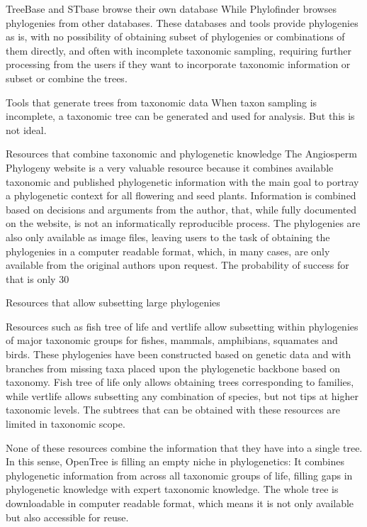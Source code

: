\documentclass[oupdraft]{sysbio_sse}
\begin{document}
TreeBase and STbase browse their own database
While Phylofinder browses phylogenies from other databases.
These databases and tools provide phylogenies as is, with no possibility of obtaining subset of phylogenies or combinations of them directly, and often with incomplete taxonomic sampling, requiring further processing from the users if they want to incorporate taxonomic information or subset or combine the trees.

Tools that generate trees from taxonomic data
When taxon sampling is incomplete, a taxonomic tree can be generated and used for analysis. But this is not ideal.

Resources that combine taxonomic and phylogenetic knowledge
The Angiosperm Phylogeny website is a very valuable resource because it combines available taxonomic and published phylogenetic information with the main goal to portray a phylogenetic context for all flowering and seed plants. Information is combined based on decisions and arguments from the author, that, while fully documented on the website, is not an informatically reproducible process. The phylogenies are also only available as image files, leaving users to the task of obtaining the phylogenies in a computer readable format, which, in many cases, are only available from the original authors upon request. The probability of success for that is only 30%

Resources that allow subsetting large phylogenies

Resources such as fish tree of life and vertlife allow subsetting within phylogenies of major taxonomic groups for fishes, mammals, amphibians, squamates and birds. These phylogenies have been constructed based on genetic data and with branches from missing taxa placed upon the phylogenetic backbone based on taxonomy. Fish tree of life only allows obtaining trees corresponding to families, while vertlife allows subsetting any combination of species, but not tips at higher taxonomic levels. The subtrees that can be obtained with these resources are limited in taxonomic scope.

None of these resources combine the information that they have into a single tree.
In this sense, OpenTree is filling an empty niche in phylogenetics:
It combines phylogenetic information from across all taxonomic groups of life, filling gaps in phylogenetic knowledge with expert taxonomic knowledge. The whole tree is downloadable in computer readable format, which means it is not only available but also accessible for reuse.
\end{document}
